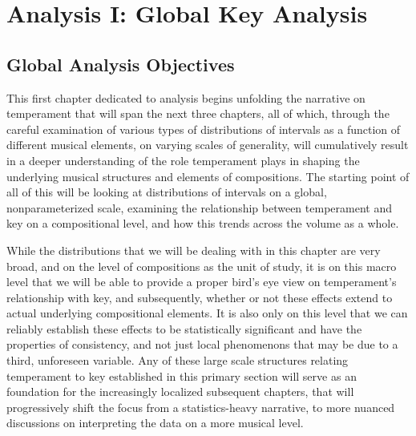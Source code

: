     
    
    
    

    \hypertarget{Analysis I: Global Key Analysis}{\chapter{Analysis I: Global Key Analysis}\label{Analysis I: Global Key Analysis}}


    \section{Global Analysis Objectives}\label{global-analysis-objectives}

    This first chapter dedicated to analysis begins unfolding the narrative
on temperament that will span the next three chapters, all of which,
through the careful examination of various types of distributions of
intervals as a function of different musical elements, on varying scales
of generality, will cumulatively result in a deeper understanding of the
role temperament plays in shaping the underlying musical structures and
elements of compositions. The starting point of all of this will be
looking at distributions of intervals on a global, nonparameterized
scale, examining the relationship between temperament and key on a
compositional level, and how this trends across the volume as a whole.

While the distributions that we will be dealing with in this chapter are
very broad, and on the level of compositions as the unit of study, it is
on this macro level that we will be able to provide a proper bird's eye
view on temperament's relationship with key, and subsequently, whether
or not these effects extend to actual underlying compositional elements.
It is also only on this level that we can reliably establish these
effects to be statistically significant and have the properties of
consistency, and not just local phenomenons that may be due to a third,
unforeseen variable. Any of these large scale structures relating
temperament to key established in this primary section will serve as an
foundation for the increasingly localized subsequent chapters, that will
progressively shift the focus from a statistics-heavy narrative, to more
nuanced discussions on interpreting the data on a more musical level.

